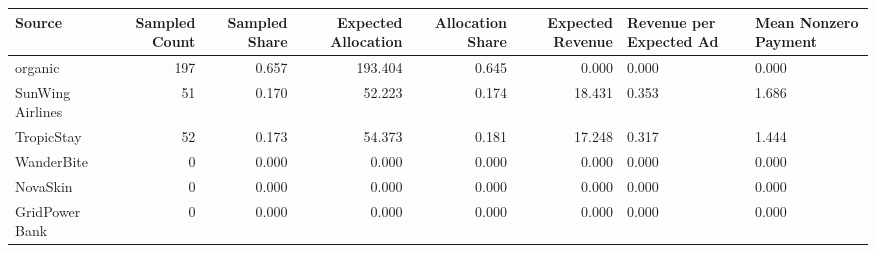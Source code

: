 \begin{tabular}{lrrrrr}
\hline
Source & Sampled Count & Sampled Share & Expected Allocation & Allocation Share & Expected Revenue & Revenue per Expected Ad & Mean Nonzero Payment \\
\hline
organic & 197 & 0.657 & 193.404 & 0.645 & 0.000 & 0.000 & 0.000 \\
SunWing Airlines & 51 & 0.170 & 52.223 & 0.174 & 18.431 & 0.353 & 1.686 \\
TropicStay & 52 & 0.173 & 54.373 & 0.181 & 17.248 & 0.317 & 1.444 \\
WanderBite & 0 & 0.000 & 0.000 & 0.000 & 0.000 & 0.000 & 0.000 \\
NovaSkin & 0 & 0.000 & 0.000 & 0.000 & 0.000 & 0.000 & 0.000 \\
GridPower Bank & 0 & 0.000 & 0.000 & 0.000 & 0.000 & 0.000 & 0.000 \\
\hline
\end{tabular}
